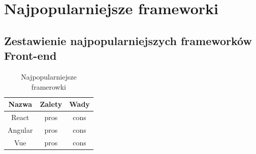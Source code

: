 \documentclass[12pt]{report}
\begin{document}
	\chapter{Najpopularniejsze frameworki}
	\section{Zestawienie najpopularniejszych frameworków Front-end}
	
	
	\begin{table}[h]
	\centering
	\begin{tabular}{|c|c|c|} 
	\hline
	Nazwa & Zalety & Wady \\ 
	\hline
	React &
	pros
	  &
	cons \\ 
	\hline
	 Angular & pros & cons \\
	 \hline
	 Vue & pros & cons \\
	 
	\hline
	\end{tabular}
	\caption{Najpopularniejsze framerowki}
	\end{table}
	

	\listoffigures
	
\end{document}
